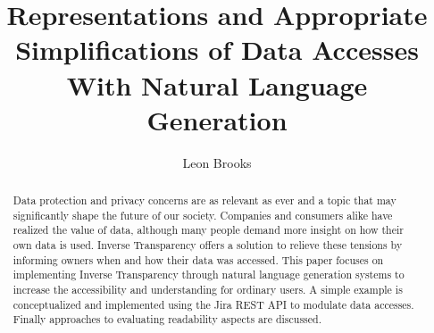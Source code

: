 \documentclass[sigconf,obeyspaces]{acmart}
\begin{document}
\title{Representations and Appropriate Simplifications of Data Accesses With Natural Language Generation}

\author{Leon Brooks}
\begin{abstract}
Data protection and privacy concerns are as relevant as ever and a topic that may significantly shape the future of our society. Companies and consumers alike have realized the value of data, although many people demand more insight on how their own data is used. Inverse Transparency offers a solution to relieve these tensions by informing owners when and how their data was accessed. This paper focuses on implementing Inverse Transparency through natural language generation systems to increase the accessibility and understanding for ordinary users. A simple example is conceptualized and implemented using the Jira REST API to modulate data accesses. Finally approaches to evaluating readability aspects are discussed. 
\end{abstract}




\maketitle
\end{document}

